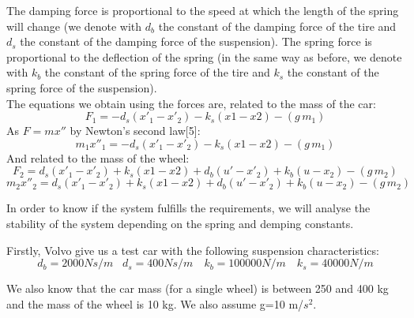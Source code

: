\documentclass[a4paper]{article}
\begin{document}
The damping force is proportional to the speed at which the length of the spring will change
(we denote with $d_b$ the constant of the damping force of the tire and $d_s$ the constant of the damping force of the suspension).
The spring force is proportional to the deflection of the spring
(in the same way as before,
we denote with $k_b$ the constant of the spring force of the tire and $k_s$ the constant of the spring force of the suspension).\\


The equations we obtain using the forces are,
related to the mass of the car:
\begin{equation}
	F_1=-d_s(x'_1-x'_2)-k_s(x1-x2)-(g\,m_1)
\end{equation}
As $F=m x''$ by Newton's second law[5]:
\begin{equation}
	m_1 x''_1=-d_s(x'_1-x'_2)-k_s(x1-x2)-(g\, m_1)
\end{equation}
And related to the mass of the wheel:
\begin{equation}
	F_2=d_s(x'_1-x'_2)+k_s(x1-x2)+d_b(u'-x'_2)+k_b(u-x_2)-(g\, m_2)
\end{equation}
\begin{equation}
	m_2 x''_2=d_s(x'_1-x'_2)+k_s(x1-x2)+d_b(u'-x'_2)+k_b(u-x_2)-(g\, m_2)
\end{equation}


\newpage


In order to know if the system fulfills the requirements,
we will analyse the stability of the system depending on the spring and demping constants.

Firstly, Volvo give us a test car with the following suspension characteristics:
$$d_b=2000 Ns/m  \,\,\,\,\, d_s=400 Ns/m  \,\,\,\,\,\,k_b=100000 N/m \,\,\,\,\,\,k_s=40000N/m$$

We also know that the car mass (for a single wheel) is between 250 and 400 kg
and the mass of the wheel is 10 kg.
We also assume g=10 m/$s^2$.
\end{document}
